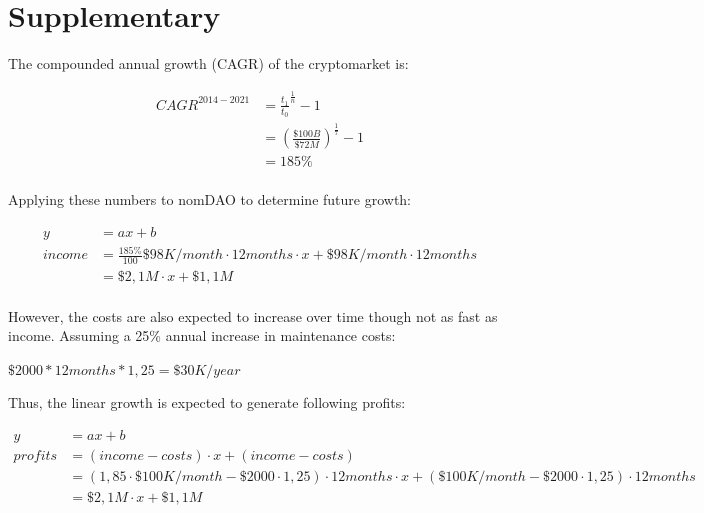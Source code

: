 \documentclass[12pt]{article}
\begin{document}






\clearpage

\section*{Supplementary}
The compounded annual growth (CAGR) of the cryptomarket is:

\begin{equation}\label{growth}
\begin{split}
CAGR^{2014-2021} &= \frac{t_{1}}{t_{0}}^{\frac{1}{n}}-1\\
 &=  (\frac{\$100B}{\$72M})^{\frac{1}{7}}-1\\
 &=185\%
\end{split}
\end{equation}
\\

Applying these numbers to nomDAO to determine future growth:

\begin{equation}\label{growth}
\begin{split}
y &=ax+b\\
income &=\frac{185\%}{100}\$98K/month \cdot 12months \cdot x + \$98K/month \cdot 12months\\
 &= \$2,1M \cdot x + \$1,1M
\end{split}
\end{equation}
\\

However, the costs are also expected to increase over time though not as fast as income. Assuming a 25\% annual increase in maintenance costs:

$\$2000*12months*1,25=\$30K/year$

Thus, the linear growth is expected to generate following profits:

\begin{equation}\label{profits}
\begin{split}
y &=ax+b\\
profits &=(income-costs) \cdot x + (income-costs)\\
 &= (1,85 \cdot \$100K/month - \$2000 \cdot 1,25)\cdot 12months \cdot  x + (\$100K/month - \$2000 \cdot 1,25)\cdot 12months\\
 &= \$2,1M \cdot x + \$1,1M
\end{split}
\end{equation}
\\
\end{document}
